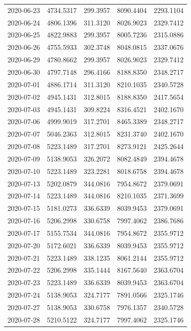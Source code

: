 {\begin{longtable}{lllll}
2020-06-23 & 4734.5317 & 299.3957 & 8090.4404 & 2293.1104 \\
2020-06-24 & 4806.1396 & 311.3120 & 8026.9023 & 2329.7412 \\
2020-06-25 & 4822.9883 & 299.3957 & 8005.7236 & 2315.0886 \\
2020-06-26 & 4755.5933 & 302.3748 & 8048.0815 & 2337.0676 \\
2020-06-29 & 4780.8662 & 299.3957 & 8026.9023 & 2329.7412 \\
2020-06-30 & 4797.7148 & 296.4166 & 8188.8350 & 2348.2717 \\
2020-07-01 & 4886.1714 & 311.3120 & 8210.1035 & 2340.5728 \\
2020-07-02 & 4945.1431 & 312.8015 & 8188.8350 & 2417.5654 \\
2020-07-03 & 4945.1431 & 309.8224 & 8316.4521 & 2402.1670 \\
2020-07-06 & 4999.9019 & 317.2701 & 8465.3389 & 2348.2717 \\
2020-07-07 & 5046.2363 & 312.8015 & 8231.3740 & 2402.1670 \\
2020-07-08 & 5223.1489 & 317.2701 & 8273.9121 & 2425.2644 \\
2020-07-09 & 5138.9053 & 326.2072 & 8082.4849 & 2394.4678 \\
2020-07-10 & 5223.1489 & 323.2281 & 8018.6758 & 2394.4678 \\
2020-07-13 & 5202.0879 & 344.0816 & 7954.8672 & 2379.0691 \\
2020-07-14 & 5223.1489 & 344.0816 & 8210.1035 & 2371.3699 \\
2020-07-15 & 5181.0273 & 336.6339 & 8039.9453 & 2379.0691 \\
2020-07-16 & 5206.2998 & 330.6758 & 7997.4062 & 2386.7686 \\
2020-07-17 & 5155.7534 & 344.0816 & 7954.8672 & 2355.9712 \\
2020-07-20 & 5172.6021 & 336.6339 & 8039.9453 & 2355.9712 \\
2020-07-21 & 5223.1489 & 338.1235 & 8061.2144 & 2355.9712 \\
2020-07-22 & 5206.2998 & 335.1444 & 8167.5640 & 2363.6704 \\
2020-07-23 & 5223.1489 & 336.6339 & 8039.9453 & 2363.6704 \\
2020-07-24 & 5138.9053 & 324.7177 & 7891.0566 & 2325.1746 \\
2020-07-27 & 5138.9053 & 330.6758 & 7976.1357 & 2340.5728 \\
2020-07-28 & 5210.5122 & 324.7177 & 7997.4062 & 2325.1746 \\

\end{longtable}}
